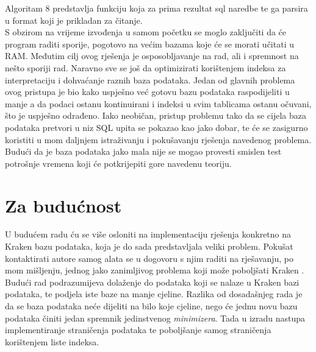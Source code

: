 \documentclass[times, utf8, zavrsni]{fer}
\begin{document}
Algoritam 8 predstavlja funkciju koja za prima rezultat sql naredbe te ga parsira u format koji je prikladan za čitanje.
\\S obzirom na vrijeme izvođenja u samom početku se moglo zaključiti da će program raditi sporije, pogotovo na većim bazama koje će se morati učitati u RAM. Međutim cilj ovog rješenja je osposobljavanje na rad, ali i spremnost na nešto sporiji rad. Naravno sve se još da optimizirati korištenjem indeksa za interpretaciju i dohvaćanje raznih baza podataka. Jedan od glavnih problema ovog pristupa je bio kako uspješno već gotovu bazu podataka raspodijeliti u manje a da podaci ostanu kontinuirani i indeksi u svim tablicama ostanu očuvani, što je uspješno odrađeno. Iako neobičan, pristup problemu tako da se cijela baza podataka pretvori u niz SQL upita se pokazao kao jako dobar, te će se zasigurno koristiti u mom daljnjem istraživanju i pokušavanju rješenja navedenog problema. Budući da je baza podataka jako mala nije se mogao provesti smislen test potrošnje vremena koji će potkrijepiti gore navedenu teoriju.
\section{Za budućnost}
U budućem radu ću se više osloniti na implementaciju rješenja konkretno na Kraken bazu podataka, koja je do sada predstavljala veliki problem. Pokušat kontaktirati autore samog alata se u dogovoru s njim raditi na rješavanju, po mom mišljenju, jednog jako zanimljivog problema koji može poboljšati Kraken . Budući rad podrazumijeva dolaženje do podataka koji se nalaze u Kraken bazi podataka, te podjela iste baze na manje cjeline. Razlika od dosadašnjeg rada je da se baza podataka neće dijeliti na bilo koje cjeline, nego će jednu novu bazu podataka činiti jedan spremnik jedinstvenog \textit{minimizera}. Tada u izradu nastupa implementiranje straničenja podataka te poboljšanje samog straničenja korištenjem liste indeksa.
\end{document}
